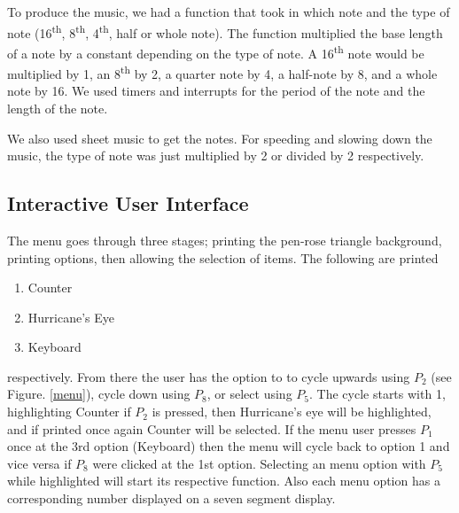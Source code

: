 \documentclass[12pt]{article}
\begin{document}
To produce the music, we had a function that took in which note and the type of note (\num{16}\textsuperscript{th}, \num{8}\textsuperscript{th}, \num{4}\textsuperscript{th}, half or whole note). The function multiplied the base length of a note by a constant depending on the type of note. A \num{16}\textsuperscript{th} note would be multiplied by \num{1}, an \num{8}\textsuperscript{th} by \num{2}, a quarter note by \num{4}, a half-note by \num{8}, and a whole note by \num{16}. We used timers and interrupts for the period of the note and the length of the note.

We also used sheet music to get the notes. For speeding and slowing down the music, the type of note was just multiplied by \num{2} or divided by \num{2} respectively.

\subsection{Interactive User Interface}
The menu goes through three stages; printing the pen-rose triangle background, printing options, then allowing the selection of items. The following are printed

\begin{enumerate}
    \item Counter
    \item Hurricane's Eye
    \item Keyboard
\end{enumerate}

\noindent respectively. From there the user has the option to to cycle upwards using $P_2$ (see Figure. \ref{menu}), cycle down using $P_8$, or select using $P_5$. The cycle starts with \num{1}, highlighting Counter if $P_2$ is pressed, then Hurricane's eye will be highlighted, and if printed once again Counter will be selected. If the menu user presses $P_1$ once at the 3rd option (Keyboard) then the menu will cycle back to option \num{1} and vice versa if $P_8$ were clicked at the 1st option. Selecting an menu option with $P_5$ while highlighted will start its respective function. Also each menu option has a corresponding number displayed on a seven segment display.
\end{document}

